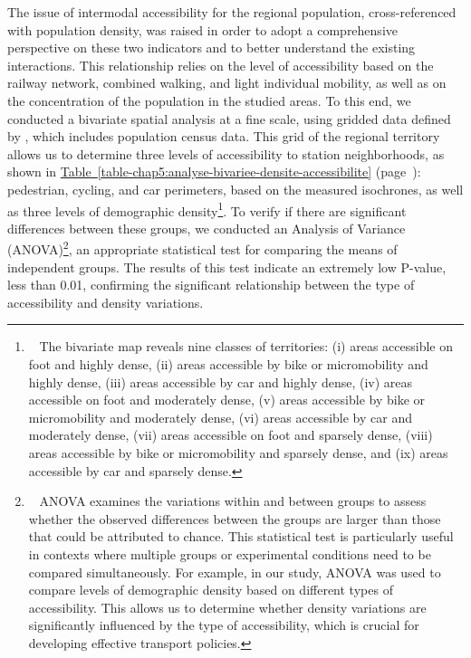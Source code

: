 \begin{refsegment}
The issue of intermodal accessibility for the regional population, cross-referenced with population density, was raised in order to adopt a comprehensive perspective on these two indicators and to better understand the existing interactions. This relationship relies on the level of accessibility based on the railway network, combined walking, and light individual mobility, as well as on the concentration of the population in the studied areas. To this end, we conducted a bivariate spatial analysis at a fine scale, using gridded data defined by \textcolor{blue}{\textcite{insee_grille_2021}}, which includes population census data. This grid of the regional territory allows us to determine three levels of accessibility to station neighborhoods, as shown in \hyperref[table-chap5:couverture-spatiale]{Table~\ref{table-chap5:analyse-bivariee-densite-accessibilite}} (page~\pageref{table-chap5:couverture-spatiale}): pedestrian, cycling, and car perimeters, based on the measured isochrones, as well as three levels of demographic density\footnote{~
    The bivariate map reveals nine classes of territories: (i) areas accessible on foot and highly dense, (ii) areas accessible by bike or micromobility and highly dense, (iii) areas accessible by car and highly dense, (iv) areas accessible on foot and moderately dense, (v) areas accessible by bike or micromobility and moderately dense, (vi) areas accessible by car and moderately dense, (vii) areas accessible on foot and sparsely dense, (viii) areas accessible by bike or micromobility and sparsely dense, and (ix) areas accessible by car and sparsely dense.
}. To verify if there are significant differences between these groups, we conducted an Analysis of Variance (ANOVA)\footnote{~
    ANOVA examines the variations within and between groups to assess whether the observed differences between the groups are larger than those that could be attributed to chance. This statistical test is particularly useful in contexts where multiple groups or experimental conditions need to be compared simultaneously. For example, in our study, ANOVA was used to compare levels of demographic density based on different types of accessibility. This allows us to determine whether density variations are significantly influenced by the type of accessibility, which is crucial for developing effective transport policies.
}, an appropriate statistical test for comparing the means of independent groups. The results of this test indicate an extremely low P-value, less than 0.01, confirming the significant relationship between the type of accessibility and density variations.%


\end{refsegment}

